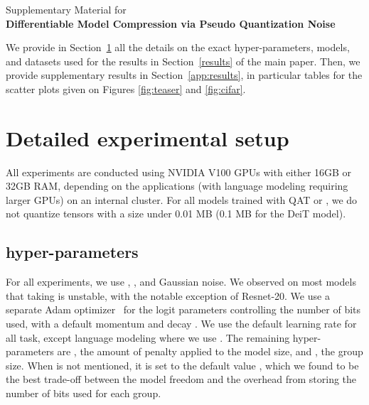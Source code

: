 \renewcommand{\thesection}{\Alph{section}}
\onecolumn
\thispagestyle{empty}
\noindent\makebox[\linewidth]{\rule{\textwidth}{1pt}}
\begin{center}\Large {} Supplementary Material for \\
\textbf{Differentiable Model Compression via Pseudo Quantization Noise}
\noindent\makebox[\linewidth]{\rule{\textwidth}{1pt}}
\end{center}
\setcounter{section}{0}
\setcounter{secnumdepth}{1}
\renewcommand\theHsection{\Alph{section}}

We provide in Section~\ref{app:xps} all the details on the 
exact hyper-parameters, models, and datasets used for the results in Section~\ref{results} of the main paper.
Then, we provide supplementary results in Section~\ref{app:results},
in particular tables for the scatter plots given on Figures \ref{fig:teaser} and \ref{fig:cifar}.

\section{Detailed experimental setup}
\label{app:xps}

All experiments are conducted using NVIDIA V100 GPUs with either 16GB or 32GB RAM, depending on the applications
(with language modeling requiring larger GPUs) on an internal cluster.
For all models trained with QAT or \diffq, we do not quantize tensors with a size under 0.01 MB (0.1 MB for the DeiT model).

\subsection{\diffq{} hyper-parameters}

For all experiments, we use , ,
 and Gaussian noise. 
We observed on most models that taking  is
unstable, with the notable exception of Resnet-20.
We use a separate Adam optimizer~\citep{adam} for the logit parameters controlling the number of bits used, with a default momentum  and decay .
We use the default learning rate  for all task,
except language modeling where we use .
The remaining hyper-parameters are , the amount of penalty
applied to the model size, and , the group size. When  is not mentioned, it is set to the default value , which we found to be the best trade-off between the model freedom and the overhead from storing the number of bits used for each group. 

